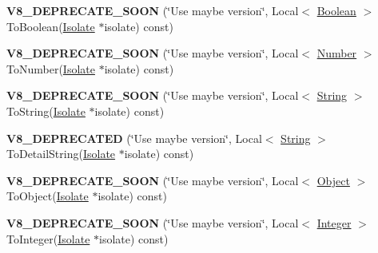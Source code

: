 \begin{DoxyCompactItemize}
\item 
{\bfseries V8\+\_\+\+D\+E\+P\+R\+E\+C\+A\+T\+E\+\_\+\+S\+O\+ON} (\char`\"{}Use maybe version\char`\"{}, Local$<$ \hyperlink{classv8_1_1Boolean}{Boolean} $>$ To\+Boolean(\hyperlink{classv8_1_1Isolate}{Isolate} $\ast$isolate) const)\hypertarget{classv8_1_1Value_ad3b9978f3fedccb48817ce87c5a454ed}{}\label{classv8_1_1Value_ad3b9978f3fedccb48817ce87c5a454ed}

\item 
{\bfseries V8\+\_\+\+D\+E\+P\+R\+E\+C\+A\+T\+E\+\_\+\+S\+O\+ON} (\char`\"{}Use maybe version\char`\"{}, Local$<$ \hyperlink{classv8_1_1Number}{Number} $>$ To\+Number(\hyperlink{classv8_1_1Isolate}{Isolate} $\ast$isolate) const)\hypertarget{classv8_1_1Value_a855a0b74584b9c322c04891783f37e9c}{}\label{classv8_1_1Value_a855a0b74584b9c322c04891783f37e9c}

\item 
{\bfseries V8\+\_\+\+D\+E\+P\+R\+E\+C\+A\+T\+E\+\_\+\+S\+O\+ON} (\char`\"{}Use maybe version\char`\"{}, Local$<$ \hyperlink{classv8_1_1String}{String} $>$ To\+String(\hyperlink{classv8_1_1Isolate}{Isolate} $\ast$isolate) const)\hypertarget{classv8_1_1Value_a898f773c591e760fcb98e99cccff3e5c}{}\label{classv8_1_1Value_a898f773c591e760fcb98e99cccff3e5c}

\item 
{\bfseries V8\+\_\+\+D\+E\+P\+R\+E\+C\+A\+T\+ED} (\char`\"{}Use maybe version\char`\"{}, Local$<$ \hyperlink{classv8_1_1String}{String} $>$ To\+Detail\+String(\hyperlink{classv8_1_1Isolate}{Isolate} $\ast$isolate) const)\hypertarget{classv8_1_1Value_a7afec72891a36d38aba6eb2ccf8b0a9d}{}\label{classv8_1_1Value_a7afec72891a36d38aba6eb2ccf8b0a9d}

\item 
{\bfseries V8\+\_\+\+D\+E\+P\+R\+E\+C\+A\+T\+E\+\_\+\+S\+O\+ON} (\char`\"{}Use maybe version\char`\"{}, Local$<$ \hyperlink{classv8_1_1Object}{Object} $>$ To\+Object(\hyperlink{classv8_1_1Isolate}{Isolate} $\ast$isolate) const)\hypertarget{classv8_1_1Value_a4c98939a72d6c48b01c8279cfe218d34}{}\label{classv8_1_1Value_a4c98939a72d6c48b01c8279cfe218d34}

\item 
{\bfseries V8\+\_\+\+D\+E\+P\+R\+E\+C\+A\+T\+E\+\_\+\+S\+O\+ON} (\char`\"{}Use maybe version\char`\"{}, Local$<$ \hyperlink{classv8_1_1Integer}{Integer} $>$ To\+Integer(\hyperlink{classv8_1_1Isolate}{Isolate} $\ast$isolate) const)\hypertarget{classv8_1_1Value_aae926c4392edf0ad4a5383ab0d8af4b1}{}\label{classv8_1_1Value_aae926c4392edf0ad4a5383ab0d8af4b1}


\end{DoxyCompactItemize}
